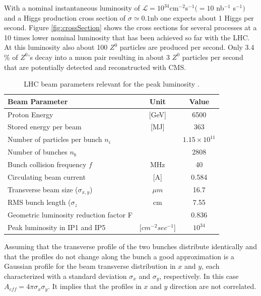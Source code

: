 With a nominal instantaneous luminosity of $\mathcal{L} = 10^{34}$cm$^{-2}$s$^{-1} (= 10$ nb$^{-1}$ s$^{-1})$ and a Higgs production cross section of $\sigma \simeq 0.1 $nb one expects about 1 Higgs per second. Figure \ref{fig:crossSection} shows the cross sections for several processes at a 10 times lower  nominal luminosity that has been achieved so far with the LHC. At this luminosity also about 100 $Z^{0}$ particles are produced per second. Only 3.4 \% of $Z^{0}$'s decay into a muon pair resulting in about 3 $Z^{0}$ particles per second that are potentially detected and reconstructed with CMS.


\begin{table}[htp]
\begin{center}
    \captionsetup{format=hang}
     \caption{LHC beam parameters relevant for the peak luminosity \cite{fill-schemes}.}
    \label{tbl:beamParam}

\begin{tabular}{|l|c|c|}
\hline
{\bf Beam Parameter} & {\bf Unit} & {\bf Value} \\ \hline
Proton Energy & [GeV] & 6500 \\ \hline
Stored energy per beam & [MJ] & 363 \\ \hline
Number of particles per bunch $n_{i}$ & & $1.15 \times 10^{11}$ \\ \hline
Number of bunches $n_{b}$ & & 2808 \\ \hline
Bunch collision frequency $f$ & MHz & 40 \\ \hline
Circulating beam current & [A] & 0.584 \\ \hline
Transverse beam size ($\sigma_{x,y}$) & $\mu m$ & 16.7 \\ \hline
RMS bunch length ($\sigma_{z}$ & cm & 7.55 \\ \hline
Geometric luminosity reduction factor F & & 0.836 \\ \hline
Peak luminosity in IP1 and IP5 & [$cm^{-2} sec^{-1}$] & $10^{34}$ \\ \hline \hline

\end{tabular}
\end{center}
\end{table}%


Assuming that the transverse profile of the two bunches distribute identically and that the profiles do not change along the bunch a good approximation is a Gaussian profile for the beam transverse distribution in $x$ and $y$, each characterized with a standard deviation $\sigma_{x}$ and $\sigma_{y}$, respectively. In this case $A_{eff} = 4 \pi \sigma_{x} \sigma_{y}$. It implies that the profiles in $x$ and $y$ direction are not correlated.


